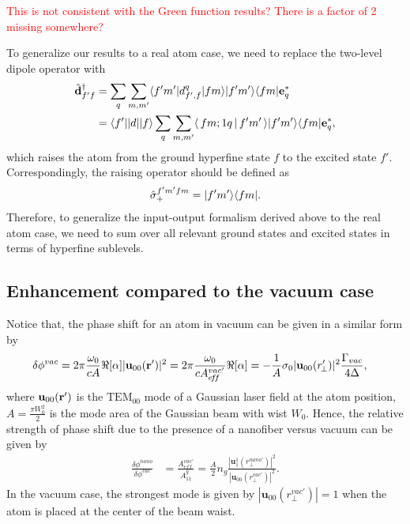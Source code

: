 \documentclass[preprint,aps,pra,onecolumn]{revtex4-1} %
\begin{document}
\textcolor{red}{This is not consistent with the Green function results? There is a factor of 2 missing somewhere?}


To generalize our results to a real atom case, we need to replace the two-level dipole operator with
\begin{align}
	\hat{ \mathbf{d} }_{f' f}^\dagger  & = \sum_q \sum_{m, m'}  \langle{f' m'}\rvert d_{f',f}^q \lvert{f m}\rangle \lvert{f' m'}\rangle\langle{f m}\rvert \mathbf{e}_q^* \\
	& = \langle{ f' }\rvert| d | \lvert{ f }\rangle \sum_q \sum_{m, m'}  \langle\, f m; 1 q\,\vert\, f' m' \,\rangle \lvert{f' m'}\rangle\langle{f m}\rvert \mathbf{e}_q^*,
\end{align}
which raises the atom from the ground hyperfine state $f$ to the excited state $f'$. Correspondingly, the raising operator should be defined as
\begin{align}
\hat{\sigma}_+^{f'm'fm} = \lvert{f' m'}\rangle\langle{f m}\rvert.
\end{align}
Therefore, to generalize the input-output formalism derived above to the real atom case, we need to sum over all relevant ground states and excited states in terms of hyperfine sublevels.


\subsection{Enhancement compared to the vacuum case}
Notice that, the phase shift for an atom in vacuum can be given in a similar form by
\begin{align}
\delta\phi^{vac} &= 2\pi \frac{\omega_0}{cA} \Re[\alpha] |\mathbf{u}_{00}(\mathbf{r}')|^2 =  2\pi \frac{\omega_0}{c A^{vac'}_{e\!f\!f}} \Re[\alpha]=-\frac{1}{A} \sigma_0 |\mathbf{u}_{00} (r'_{\!\perp})|^2 \frac{\Gamma_{vac}}{4\Delta},
\end{align}
where $\mathbf{u}_{00}(\mathbf{r}')  $ is the $\mathrm{TEM}_{00}$ mode of a Gaussian laser field at the atom position, $ A=\frac{\pi W_0^2}{2} $ is the mode area of the Gaussian beam with wist $ W_0 $. Hence, the relative strength of phase shift due to the presence of a nanofiber versus vacuum can be given by
\begin{align}
\frac{\delta\phi^{nano}}{\delta\phi^{vac}} &=\frac{A_{e\!f\!f}^{vac'}}{A^g_{11}}= \frac{A}{2} \!n_g\! \frac{|\mathbf{u}^1_1(r_\perp^{nano'})|^2}{|\mathbf{u}_{00}(r_\perp^{vac'})|^2}.
\end{align}
In the vacuum case, the strongest mode is given by $ |\mathbf{u}_{00}(r_\perp^{vac'})|=1 $ when the atom is placed at the center of the beam waist. 
\end{document}
